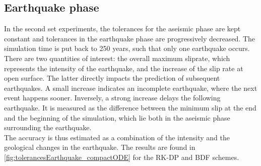 \subsection{Earthquake phase}
In the second set experiments, the tolerances for the aseismic phase are kept constant and tolerances in the earthquake phase are progressively decreased. The simulation time is put back to 250 years, such that only one earthquake occurs. There are two quantities of interest: the overall maximum sliprate, which represents the intensity of the earthquake, and the increase of the slip rate at open surface. The latter directly impacts the prediction of subsequent earthquakes. A small increase indicates an incomplete earthquake, where the next event happens sooner. Inversely, a strong increase delays the following earthquake. It is measured as the difference between the minimum slip at the end and the beginning of the simulation, which lie both in the aseismic phase surrounding the earthquake. \\
The accuracy is thus estimated as a combination of the intensity and the geological changes in the earthquake. The results are found in \autoref{fig:tolerancesEarthquake_compactODE} for the RK-DP and BDF schemes.

